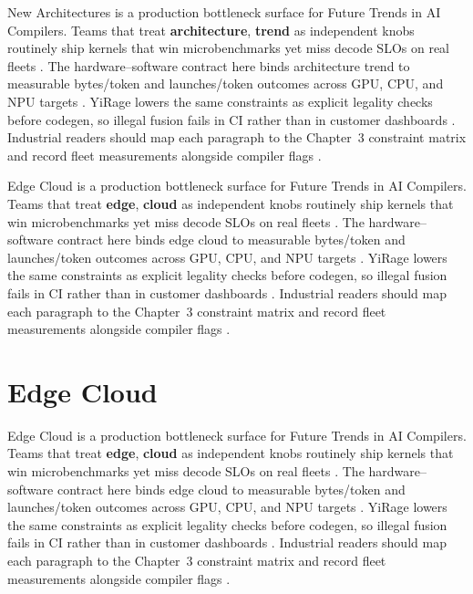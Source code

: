 New Architectures is a production bottleneck surface for Future Trends in AI Compilers. Teams that treat \textbf{architecture}, \textbf{trend} as independent knobs routinely ship kernels that win microbenchmarks yet miss decode SLOs on real fleets \citep{patel2025llminference,nvidia2022hopper}. The hardware--software contract here binds architecture trend to measurable bytes/token and launches/token outcomes across GPU, CPU, and NPU targets \citep{taxbreak2026,semianalysis2024tma}. YiRage lowers the same constraints as explicit legality checks before codegen, so illegal fusion fails in CI rather than in customer dashboards \citep{memoryfloor2026,amd2024xdna}. Industrial readers should map each paragraph to the Chapter~3 constraint matrix and record fleet measurements alongside compiler flags \citep{nvidia2022hopper,amd2024aie}.

Edge Cloud is a production bottleneck surface for Future Trends in AI Compilers. Teams that treat \textbf{edge}, \textbf{cloud} as independent knobs routinely ship kernels that win microbenchmarks yet miss decode SLOs on real fleets \citep{taxbreak2026,semianalysis2024tma}. The hardware--software contract here binds edge cloud to measurable bytes/token and launches/token outcomes across GPU, CPU, and NPU targets \citep{memoryfloor2026,amd2024xdna}. YiRage lowers the same constraints as explicit legality checks before codegen, so illegal fusion fails in CI rather than in customer dashboards \citep{nvidia2022hopper,amd2024aie}. Industrial readers should map each paragraph to the Chapter~3 constraint matrix and record fleet measurements alongside compiler flags \citep{semianalysis2024tma,dlbook}.

\section{Edge Cloud}
\label{sec:edge_cloud}

Edge Cloud is a production bottleneck surface for Future Trends in AI Compilers. Teams that treat \textbf{edge}, \textbf{cloud} as independent knobs routinely ship kernels that win microbenchmarks yet miss decode SLOs on real fleets \citep{memoryfloor2026,amd2024xdna}. The hardware--software contract here binds edge cloud to measurable bytes/token and launches/token outcomes across GPU, CPU, and NPU targets \citep{nvidia2022hopper,amd2024aie}. YiRage lowers the same constraints as explicit legality checks before codegen, so illegal fusion fails in CI rather than in customer dashboards \citep{semianalysis2024tma,dlbook}. Industrial readers should map each paragraph to the Chapter~3 constraint matrix and record fleet measurements alongside compiler flags \citep{amd2024xdna,dao2022flashattention}.

